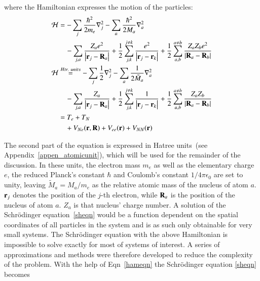 where the Hamiltonian expresses the motion of the particles:
\begin{align}\label{hameqn}
 \mathcal{H} &= -\sum_j \frac{\hbar^2}{2m_e}\nabla^2_j - \sum_a \frac{\hbar^2}{2M_a}\nabla^2_a \nonumber \\
			& \quad -\sum_{j,a}\frac{Z_ae^2}{\abs{\vb{r}_j-\vb{R}_a}} + \frac{1}{2}\sum_{j,k}^{j\neq k} \frac{e^2}{\abs{\vb{r}_j - \vb{r}_k}} + \frac{1}{2}\sum_{a,b}^{a\neq b} \frac{Z_aZ_be^2}{\abs{\vb{R}_a - \vb{R}_b}} \nonumber \\
 \mathcal{H} & \stackrel{Htr.\ units}{=} -\sum_j\frac{1}{2}\nabla^2_j - \sum_a\frac{1}{2\tilde{M}_a}\nabla_a^2 \nonumber \\
			& \quad -\sum_{j,a}\frac{Z_a}{\abs{\vb{r}_j - \vb{R}_a}} + \frac{1}{2}\sum_{j,k}^{j\neq k} \frac{1}{\abs{\vb{r}_j-\vb{r}_k}} + \frac{1}{2}\sum_{a,b}^{a\neq b} \frac{Z_aZ_b}{\abs{\vb{R}_a - \vb{R}_b}} \nonumber \\
   & = T_e + T_N \nonumber \\
   & \quad + V_{Ne}(\vb{r},\vb{R}) + V_{ee}(\vb{r}) + V_{NN}(\vb{r}) 
\end{align}


The second part of the equation is expressed in Hatree units~(see Appendix~\ref{appen_atomicunit}), which will be used for the remainder of the discussion. In these units, the electron mass $m_e$ as well as the elementary charge $e$, the reduced Planck's constant $\hbar$ and Coulomb's constant $1/4\pi\epsilon_0$ are set to unity, leaving $\tilde{M}_a = M_a/m_e$ as the relative atomic mass of the nucleus of atom $a$. $\vb{r}_j$ denotes the position of the $j$-th electron, while $\vb{R}_a$ is the position of the nucleus of atom $a$. $Z_a$ is that nucleus' charge number. A solution of the Schr\"odinger equation~\eqref{sheqn} would be a function dependent on the spatial coordinates of all particles in the system and is as such only obtainable for very small systems. The Schr\"odinger equation with the above Hamiltonian is impossible to solve exactly for most of systems of interest. A series of approximations and methods were therefore developed to reduce the complexity of the problem. With the help of Eqn~\eqref{hameqn} the Schr\"odinger equation \eqref{sheqn} becomes 

